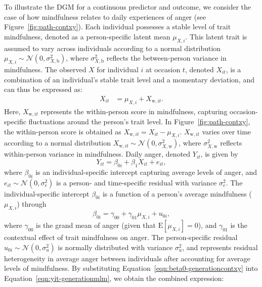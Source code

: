 \documentclass[stu]{apa7}
\begin{document}
To illustrate the DGM for a continuous predictor and outcome, we consider the case of how mindfulness relates to daily experiences of anger (see Figure~\ref{fig:path-contxy}). Each individual possesses a stable level of trait mindfulness, denoted as a person-specific latent mean \( \mu_{X,i} \). This latent trait is assumed to vary across individuals according to a normal distribution $\mu_{X,i} \sim \mathcal{N}(0, \sigma^2_{X,\text{b}})$, where \( \sigma^2_{X,\text{b}} \) reflects the between-person variance in mindfulness. The observed $X$ for individual \( i \) at occasion \( t \), denoted \( X_{it} \), is a combination of an individual's stable trait level and a momentary deviation, and can thus be expressed as:
\begin{align}
    \label{eqn:relationwithinmundlak}
    X_{it} &= \mu_{X,i} + X_{\text{w},it}.
\end{align}
Here, \( X_{\text{w},it} \) represents the within-person score in mindfulness, capturing occasion-specific fluctuations around the person’s trait level. In Figure~\ref{fig:path-contxy}, the within-person score is obtained as $X_{\text{w},it} = X_{it} - \mu_{X,i}$. $X_{\text{w},it}$ varies over time according to a normal distribution \( X_{\text{w},it} \sim \mathcal{N}(0, \sigma^2_{X,\text{w}}) \), where \( \sigma^2_{X,\text{w}} \) reflects within-person variance in mindfulness. Daily anger, denoted \( Y_{it} \), is given by
\begin{equation}
    \label{eqn:yit-generationmlm}
    Y_{it} = \beta_{0i} + \beta_{1} X_{it} + e_{it},
\end{equation}
where \( \beta_{0i} \) is an individual-specific intercept capturing average levels of anger, and \( e_{it} \sim \mathcal{N}(0, \sigma^2_{e}) \) is a person- and time-specific residual with variance $\sigma^2_e$. The individual-specific intercept \( \beta_{0i} \) is a function of a person’s average mindfulness ($\mu_{X,i}$) through
\begin{equation}
    \label{eqn:beta0-generationcontxy}
    \beta_{0i} = \gamma_{00} + \gamma_{01} \mu_{X,i} + u_{0i},
\end{equation}
where \( \gamma_{00} \) is the grand mean of anger (given that $\mathrm{E} \left[ \mu_{X,i} \right] = 0$), and \( \gamma_{01} \) is the contextual effect of trait mindfulness on anger. The person-specific residual \( u_{0i} \sim \mathcal{N}(0, \sigma^2_u) \) is normally distributed with variance \( \sigma^2_u \), and represents residual heterogeneity in average anger between individuals after accounting for average levels of mindfulness. By substituting Equation~\ref{eqn:beta0-generationcontxy} into Equation~\ref{eqn:yit-generationmlm}, we obtain the combined expression:
\end{document}
